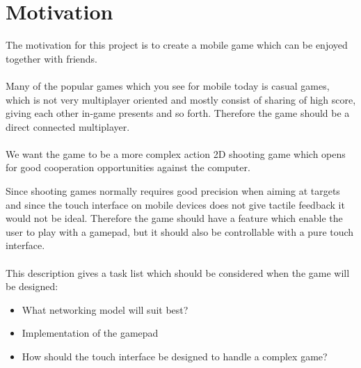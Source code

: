 \section{Motivation}
The motivation for this project is to create a mobile game which can be enjoyed together with friends.\\\\
Many of the popular games which you see for mobile today is casual games, which is not very multiplayer oriented and mostly consist of sharing of high score, giving each other in-game presents and so forth.
Therefore the game should be a direct connected multiplayer.\\\\
We want the game to be a more complex action 2D shooting game which opens for good cooperation opportunities against the computer.

Since shooting games normally requires good precision when aiming at targets and since the touch interface on mobile devices does not give tactile feedback it would not be ideal. Therefore the game should have a feature which enable the user to play with a gamepad, but it should also be controllable with a pure touch interface.\\\\
This description gives a task list which should be considered when the game will be designed:
\begin{itemize}
\item What networking model will suit best?
\item Implementation of the gamepad
\item How should the touch interface be designed to handle a complex game? 
\end{itemize}